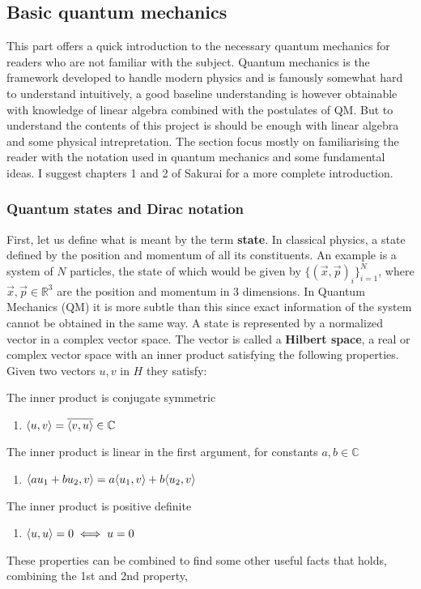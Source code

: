 
\subsection{Basic quantum mechanics}
This part offers a quick introduction to the necessary quantum mechanics for readers who are not familiar with the subject. Quantum mechanics is the framework developed to handle modern physics and is famously somewhat hard to understand intuitively, 
a good baseline understanding is however obtainable with knowledge of linear algebra combined with the postulates of QM. But to understand the contents of this project is should be enough with linear algebra and some physical intrepretation. The section focus mostly on familiarising the reader with the notation used in quantum mechanics and some fundamental ideas. I suggest chapters 1  and 2 of Sakurai\cite{Sakurai} for a more complete introduction.


\subsubsection{Quantum states and Dirac notation}
First, let us define what is meant by the term \textbf{state}. In classical physics, a state defined by the position and momentum of all its constituents. An example is a system of $N$ particles, the state of which would be given by $\{ (\vec{x}, \vec{p})_i \}_{i=1}^N$, where $\vec{x},\vec{p} \in \mathbb{R}^3$ are the position and momentum in 3 dimensions. In Quantum Mechanics (QM) it is more subtle than this since exact information of the system cannot be obtained in the same way. A state is represented by a normalized vector in a complex vector space. The vector is called a \textbf{Hilbert space}, a real or complex vector space with an inner product satisfying the following properties. Given two vectors $u,v$ in $H$ they satisfy:

\noindent The inner product is conjugate symmetric
\begin{enumerate}
\item $\langle u,v \rangle = \overline{\langle v,u \rangle} \in \mathbb{C}$
\end{enumerate}
The inner product is linear in the first argument, for constants $a,b\in \mathbb{C}$
\begin{enumerate}[resume]
\item $\langle au_1 + bu_2,v \rangle = a\langle u_1,v \rangle + b\langle u_2,v \rangle$
\end{enumerate}
The inner product is positive definite 
\begin{enumerate}[resume]
\item $\langle u,u \rangle = 0 \iff u = 0$
\end{enumerate}
These properties can be combined to find some other useful facts that holds,
combining the 1st and 2nd property,

